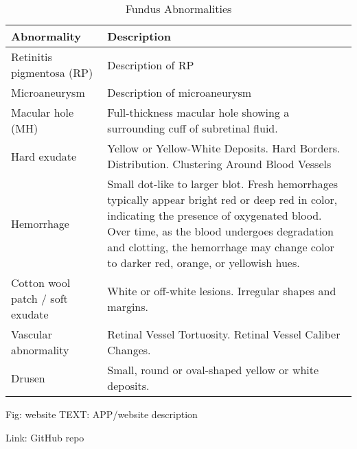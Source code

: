 \documentclass{article}
\begin{document}
	{
		\fontsize{9}{12}\selectfont
		{
			\begin{longtable}{lp{3.8in}}
				\caption{Fundus Abnormalities}
				\label{tb:fundus-ab}\\
				\toprule
				Abnormality&Description\\
				\toprule
				
				\multicolumn{1}{l}{Retinitis pigmentosa (RP)}
				& Description of RP\\
				
				\multicolumn{1}{l}{Microaneurysm}
				& Description of microaneurysm\\
				
				\multicolumn{1}{l}{Macular hole (MH)} & Full-thickness macular hole showing a surrounding cuff of subretinal fluid.\\
				
				\multicolumn{1}{l}{Hard exudate} & Yellow or Yellow-White Deposits.  Hard Borders.  Distribution.  Clustering Around Blood Vessels\\
				
				\multicolumn{1}{l}{Hemorrhage} & Small dot-like to larger blot.  Fresh hemorrhages typically appear bright red or deep red in color, indicating the presence of oxygenated blood. Over time, as the blood undergoes degradation and clotting, the hemorrhage may change color to darker red, orange, or yellowish hues.\\
				
				\multicolumn{1}{l}{Cotton wool patch / soft exudate} & White or off-white lesions.  Irregular shapes and margins.\\
				
				\multicolumn{1}{l}{Vascular abnormality} & Retinal Vessel Tortuosity.  Retinal Vessel Caliber Changes.  \\
				
				\multicolumn{1}{l}{Drusen} & Small, round or oval-shaped yellow or white deposits.\\
				
				\bottomrule
			\end{longtable}
		}
	}
	
	
	Fig: website
	TEXT: APP/website description
	
	Link: GitHub repo
	
\end{document}

